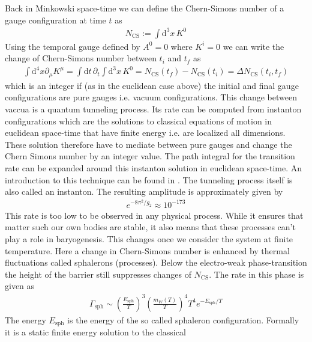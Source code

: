 \documentclass[13pt,a4paper,titlepage]{article}
\begin{document}
\noindent
Back in Minkowski space-time we can define the Chern-Simons number of a gauge configuration at time $t$ as \cite[eq. 23]{Dine_2003_Bayrogenesis}
\begin{align}
    N_{\mathrm{CS}} := \int \mathrm{d}^3 x \, K^0
\end{align}
Using the temporal gauge \cite{temporal_gauge_10.1007/BFb0015141} defined by $A^0 = 0$ where $K^i = 0$ we can
write the change of Chern-Simons number between $t_i$ and $t_f$ as
\begin{align}
    \int \mathrm{d}^4 x \partial_\mu K^\mu = \int \mathrm{d} t \, \partial_t \int \mathrm{d}^3 x \, K^0 =
    N_{\mathrm{CS}}(t_f) - N_{\mathrm{CS}}(t_i) = \Delta N_{\mathrm{CS}}(t_i, t_f)
\end{align}
which is an integer if (as in the euclidean case above) the initial and final gauge configurations are pure gauges i.e. vacuum configurations.
This change between vaccua is a quantum tunneling process. Its rate can be computed from instanton configurations which are the solutions to classical equations of motion in euclidean space-time that have finite energy i.e. are localized all dimensions. These solution therefore have to mediate between pure  gauges and change the Chern Simons number by an integer value.
The path integral for the transition rate can be expanded around this instanton solution in euclidean space-time. An introduction to this technique can be found in \cite[Chap. 7]{aspects_of_symmmetry}. The tunneling process itself is also called an instanton.
The resulting amplitude is approximately given by \cite[4.8]{Cline:2006ts_Baryogenesis}
\begin{align}
    e^{-8 \pi^2 / g_2} \approx 10^{-173}
\end{align}
This rate is too low to be observed in any physical process. While it ensures
that matter such our own bodies are stable, it also means that these processes
can't play a role in baryogenesis.
This changes once we consider the system at finite temperature.
Here a change in Chern-Simons number is enhanced by thermal fluctuations called  sphalerons (processes).
Below the electro-weak phase-transition the height of the barrier still
suppresses changes of $N_{\mathrm{CS}}$.
The rate in this phase is given as \cite[eq. 4.10]{Cline:2006ts_Baryogenesis}
\begin{align}
    \Gamma_{\mathrm{sph}} \sim \left( \frac{E_{\mathrm{sph}}}{T} \right)^3 \left( \frac{m_W(T)}{T} \right)^4 T^4 e^{- E_{\mathrm{sph}} / T}
\end{align}
The energy $E_{\mathrm{sph}}$ is the energy of the so called sphaleron configuration. Formally it is a static finite energy solution to the classical
\end{document}
